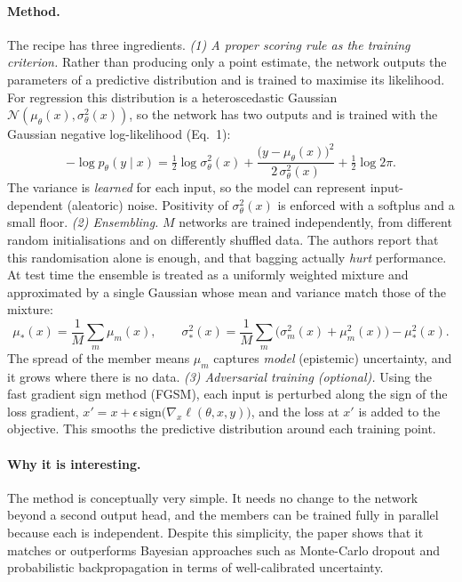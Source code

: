 \documentclass{article}
\begin{document}
\paragraph{Method.}
The recipe has three ingredients.
\emph{(1) A proper scoring rule as the training criterion.} Rather than
producing only a point estimate, the network outputs the parameters of a
predictive distribution and is trained to maximise its likelihood. For
regression this distribution is a heteroscedastic Gaussian
$\mathcal{N}(\mu_\theta(x),\sigma^2_\theta(x))$, so the network has two outputs
and is trained with the Gaussian negative log-likelihood (Eq.~1):
\begin{equation}
  -\log p_\theta(y\mid x) =
  \tfrac{1}{2}\log \sigma^2_\theta(x)
  + \frac{\big(y-\mu_\theta(x)\big)^2}{2\,\sigma^2_\theta(x)}
  + \tfrac{1}{2}\log 2\pi .
  \label{eq:nll}
\end{equation}
The variance is \emph{learned} for each input, so the model can represent
input-dependent (aleatoric) noise. Positivity of $\sigma^2_\theta(x)$ is
enforced with a softplus and a small floor.
\emph{(2) Ensembling.} $M$ networks are trained independently, from different
random initialisations and on differently shuffled data. The authors report
that this randomisation alone is enough, and that bagging actually \emph{hurt}
performance. At test time the ensemble is treated as a uniformly weighted
mixture and approximated by a single Gaussian whose mean and variance match
those of the mixture:
\begin{equation}
  \mu_*(x)=\frac{1}{M}\sum_{m}\mu_m(x), \qquad
  \sigma_*^2(x)=\frac{1}{M}\sum_{m}\!\big(\sigma_m^2(x)+\mu_m^2(x)\big)-\mu_*^2(x).
  \label{eq:mixture}
\end{equation}
The spread of the member means $\mu_m$ captures \emph{model} (epistemic)
uncertainty, and it grows where there is no data.
\emph{(3) Adversarial training (optional).} Using the fast gradient sign method
(FGSM), each input is perturbed along the sign of the loss gradient,
$x' = x + \epsilon\,\mathrm{sign}\big(\nabla_x \ell(\theta,x,y)\big)$, and the
loss at $x'$ is added to the objective. This smooths the predictive
distribution around each training point.

\paragraph{Why it is interesting.}
The method is conceptually very simple. It needs no change to the network beyond
a second output head, and the members can be trained fully in parallel because
each is independent. Despite this simplicity, the paper shows that it matches or
outperforms Bayesian approaches such as Monte-Carlo dropout and probabilistic
backpropagation in terms of well-calibrated uncertainty.
\end{document}
